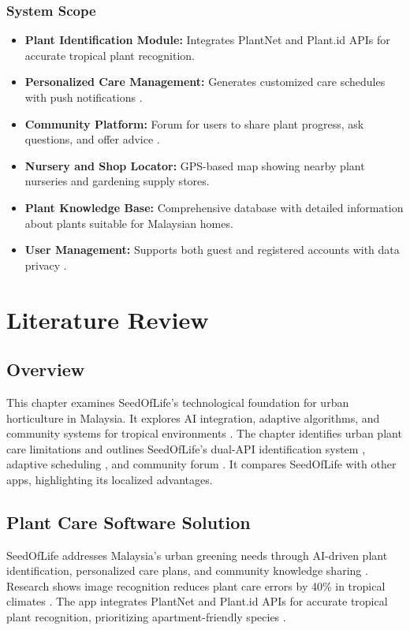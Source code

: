 \documentclass[conference]{IEEEtran}
\begin{document}
\subsubsection{System Scope}
\label{sssec:system-scope}
\begin{itemize}
    \item \textbf{Plant Identification Module:} Integrates PlantNet and Plant.id APIs \cite{plantnet2024, plantid2024} for accurate tropical plant recognition.
    \item \textbf{Personalized Care Management:} Generates customized care schedules with push notifications \cite{flutter2024, firebase2024}.
    \item \textbf{Community Platform:} Forum for users to share plant progress, ask questions, and offer advice \cite{ugam2024}.
    \item \textbf{Nursery and Shop Locator:} GPS-based map showing nearby plant nurseries and gardening supply stores.
    \item \textbf{Plant Knowledge Base:} Comprehensive database with detailed information about plants suitable for Malaysian homes.
    \item \textbf{User Management:} Supports both guest and registered accounts with data privacy \cite{firebase2024}.
\end{itemize}


\section{Literature Review}
\label{sec:literature-review}

\subsection{Overview}
\label{subsec:overview-literature}
This chapter examines SeedOfLife's technological foundation for urban horticulture in Malaysia. It explores AI integration, adaptive algorithms, and community systems for tropical environments \cite{chen2023, lim2023}. The chapter identifies urban plant care limitations and outlines SeedOfLife's dual-API identification system \cite{plantnet2024, plantid2024}, adaptive scheduling \cite{global2024}, and community forum \cite{ugam2024}. It compares SeedOfLife with other apps, highlighting its localized advantages.

\subsection{Plant Care Software Solution}
\label{subsec:plant-care-software}
SeedOfLife addresses Malaysia's urban greening needs through AI-driven plant identification, personalized care plans, and community knowledge sharing \cite{chen2023, stats2023}. Research shows image recognition reduces plant care errors by 40\% in tropical climates \cite{chen2023}. The app integrates PlantNet and Plant.id APIs \cite{plantnet2024, plantid2024} for accurate tropical plant recognition, prioritizing apartment-friendly species \cite{wong2023}.
\end{document}
